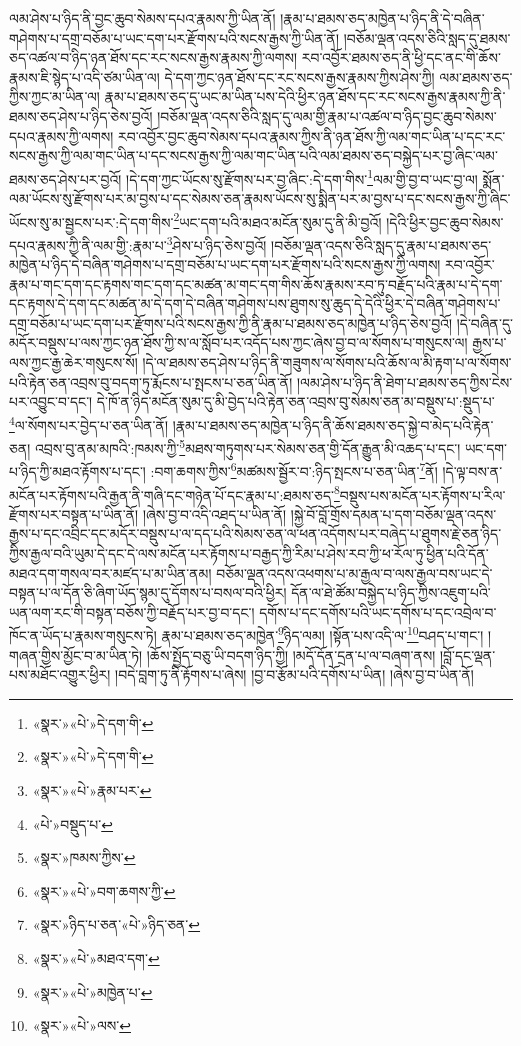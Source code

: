 ལམ་ཤེས་པ་ཉིད་ནི་བྱང་ཆུབ་སེམས་དཔའ་རྣམས་ཀྱི་ཡིན་ནོ། །རྣམ་པ་ཐམས་ཅད་མཁྱེན་པ་ཉིད་ནི་དེ་བཞིན་གཤེགས་པ་དགྲ་བཅོམ་པ་ཡང་དག་པར་རྫོགས་པའི་སངས་རྒྱས་ཀྱི་ཡིན་ནོ། །བཅོམ་ལྡན་འདས་ཅིའི་སླད་དུ་ཐམས་ཅད་འཚལ་བ་ཉིད་ཉན་ཐོས་དང་རང་སངས་རྒྱས་རྣམས་ཀྱི་ལགས། རབ་འབྱོར་ཐམས་ཅད་ནི་ཕྱི་དང་ནང་གི་ཆོས་རྣམས་ཇི་སྙེད་པ་འདི་ཙམ་ཡིན་ལ། དེ་དག་ཀྱང་ཉན་ཐོས་དང་རང་སངས་རྒྱས་རྣམས་ཀྱིས་ཤེས་ཀྱི། ལམ་ཐམས་ཅད་ཀྱིས་ཀྱང་མ་ཡིན་ལ། རྣམ་པ་ཐམས་ཅད་དུ་ཡང་མ་ཡིན་པས་དེའི་ཕྱིར་ཉན་ཐོས་དང་རང་སངས་རྒྱས་རྣམས་ཀྱི་ནི་ཐམས་ཅད་ཤེས་པ་ཉིད་ཅེས་བྱའོ། །བཅོམ་ལྡན་འདས་ཅིའི་སླད་དུ་ལམ་གྱི་རྣམ་པ་འཚལ་བ་ཉིད་བྱང་ཆུབ་སེམས་དཔའ་རྣམས་ཀྱི་ལགས། རབ་འབྱོར་བྱང་ཆུབ་སེམས་དཔའ་རྣམས་ཀྱིས་ནི་ཉན་ཐོས་ཀྱི་ལམ་གང་ཡིན་པ་དང་རང་སངས་རྒྱས་ཀྱི་ལམ་གང་ཡིན་པ་དང་སངས་རྒྱས་ཀྱི་ལམ་གང་ཡིན་པའི་ལམ་ཐམས་ཅད་བསྐྱེད་པར་བྱ་ཞིང་ལམ་ཐམས་ཅད་ཤེས་པར་བྱའོ། །དེ་དག་ཀྱང་ཡོངས་སུ་རྫོགས་པར་བྱ་ཞིང་:དེ་དག་གིས་\footnote{«སྣར་»«པེ་»དེ་དག་གི་}ལམ་གྱི་བྱ་བ་ཡང་བྱ་ལ། སྨོན་ལམ་ཡོངས་སུ་རྫོགས་པར་མ་བྱས་པ་དང་སེམས་ཅན་རྣམས་ཡོངས་སུ་སྨིན་པར་མ་བྱས་པ་དང་སངས་རྒྱས་ཀྱི་ཞིང་ཡོངས་སུ་མ་སྦྱངས་པར་:དེ་དག་གིས་\footnote{«སྣར་»«པེ་»དེ་དག་གི་}ཡང་དག་པའི་མཐའ་མངོན་སུམ་དུ་ནི་མི་བྱའོ། །དེའི་ཕྱིར་བྱང་ཆུབ་སེམས་དཔའ་རྣམས་ཀྱི་ནི་ལམ་གྱི་:རྣམ་པ་\footnote{«སྣར་»«པེ་»རྣམ་པར་}ཤེས་པ་ཉིད་ཅེས་བྱའོ། །བཅོམ་ལྡན་འདས་ཅིའི་སླད་དུ་རྣམ་པ་ཐམས་ཅད་མཁྱེན་པ་ཉིད་དེ་བཞིན་གཤེགས་པ་དགྲ་བཅོམ་པ་ཡང་དག་པར་རྫོགས་པའི་སངས་རྒྱས་ཀྱི་ལགས། རབ་འབྱོར་རྣམ་པ་གང་དག་དང་རྟགས་གང་དག་དང་མཚན་མ་གང་དག་གིས་ཆོས་རྣམས་རབ་ཏུ་བརྗོད་པའི་རྣམ་པ་དེ་དག་དང་རྟགས་དེ་དག་དང་མཚན་མ་དེ་དག་དེ་བཞིན་གཤེགས་པས་ཐུགས་སུ་ཆུད་དེ་དེའི་ཕྱིར་དེ་བཞིན་གཤེགས་པ་དགྲ་བཅོམ་པ་ཡང་དག་པར་རྫོགས་པའི་སངས་རྒྱས་ཀྱི་ནི་རྣམ་པ་ཐམས་ཅད་མཁྱེན་པ་ཉིད་ཅེས་བྱའོ། །དེ་བཞིན་དུ་མདོར་བསྡུས་པ་ལས་ཀྱང་ཉན་ཐོས་ཀྱི་ས་ལ་སློབ་པར་འདོད་པས་ཀྱང་ཞེས་བྱ་བ་ལ་སོགས་པ་གསུངས་ལ། རྒྱས་པ་ལས་ཀྱང་རྒྱ་ཆེར་གསུངས་སོ། །དེ་ལ་ཐམས་ཅད་ཤེས་པ་ཉིད་ནི་གཟུགས་ལ་སོགས་པའི་ཆོས་ལ་མི་རྟག་པ་ལ་སོགས་པའི་རྟེན་ཅན་འབྲས་བུ་བདག་ཏུ་རྨོངས་པ་སྤངས་པ་ཅན་ཡིན་ནོ། །ལམ་ཤེས་པ་ཉིད་ནི་ཐེག་པ་ཐམས་ཅད་ཀྱིས་ངེས་པར་འབྱུང་བ་དང་། དེ་ཁོ་ན་ཉིད་མངོན་སུམ་དུ་མི་བྱེད་པའི་རྟེན་ཅན་འབྲས་བུ་སེམས་ཅན་མ་བསྡུས་པ་:སྡུད་པ་\footnote{«པེ་»བསྡུད་པ་}ལ་སོགས་པར་བྱེད་པ་ཅན་ཡིན་ནོ། །རྣམ་པ་ཐམས་ཅད་མཁྱེན་པ་ཉིད་ནི་ཆོས་ཐམས་ཅད་སྐྱེ་བ་མེད་པའི་རྟེན་ཅན། འབྲས་བུ་ནམ་མཁའི་:ཁམས་ཀྱི་\footnote{«སྣར་»ཁམས་ཀྱིས་}མཐས་གཏུགས་པར་སེམས་ཅན་གྱི་དོན་རྒྱུན་མི་འཆད་པ་དང་། ཡང་དག་པ་ཉིད་ཀྱི་མཐའ་རྟོགས་པ་དང་། :བག་ཆགས་ཀྱིས་\footnote{«སྣར་»«པེ་»བག་ཆགས་ཀྱི་}མཚམས་སྦྱོར་བ་:ཉིད་སྤངས་པ་ཅན་ཡིན་\footnote{«སྣར་»ཉིད་པ་ཅན་«པེ་»ཉིད་ཅན་}ནོ། །དེ་ལྟ་བས་ན་མངོན་པར་རྟོགས་པའི་རྒྱན་ནི་གཞི་དང་གཉེན་པོ་དང་རྣམ་པ་:ཐམས་ཅད་\footnote{«སྣར་»«པེ་»མཐའ་དག་}བསྡུས་པས་མངོན་པར་རྟོགས་པ་རིལ་རྫོགས་པར་བསྟན་པ་ཡིན་ནོ། །ཞེས་བྱ་བ་འདི་འཐད་པ་ཡིན་ནོ། །སྐྱེ་བོ་བློ་གྲོས་དམན་པ་དག་བཅོམ་ལྡན་འདས་རྒྱས་པ་དང་འབྲིང་དང་མདོར་བསྡུས་པ་ལ་དད་པའི་སེམས་ཅན་ལ་ཕན་འདོགས་པར་བཞེད་པ་ཐུགས་རྗེ་ཅན་ཉིད་ཀྱིས་རྒྱལ་བའི་ཡུམ་དེ་དང་དེ་ལས་མངོན་པར་རྟོགས་པ་བརྒྱད་ཀྱི་རིམ་པ་ཤེས་རབ་ཀྱི་ཕ་རོལ་ཏུ་ཕྱིན་པའི་དོན་མཐའ་དག་གསལ་བར་མཛད་པ་མ་ཡིན་ནམ། བཅོམ་ལྡན་འདས་འཕགས་པ་མ་རྒྱལ་བ་ལས་རྒྱལ་བས་ཡང་དེ་བསྟན་པ་ལ་དོན་ཅི་ཞིག་ཡོད་སྙམ་དུ་དོགས་པ་བསལ་བའི་ཕྱིར། དོན་ལ་ཐེ་ཚོམ་བསྐྱེད་པ་ཉིད་ཀྱིས་འཇུག་པའི་ཡན་ལག་རང་གི་བསྟན་བཅོས་ཀྱི་བརྗོད་པར་བྱ་བ་དང་། དགོས་པ་དང་དགོས་པའི་ཡང་དགོས་པ་དང་འབྲེལ་བ་ཁོང་ན་ཡོད་པ་རྣམས་གསུངས་ཏེ། རྣམ་པ་ཐམས་ཅད་མཁྱེན་\footnote{«སྣར་»«པེ་»མཁྱེན་པ་}ཉིད་ལམ། །སྟོན་པས་འདི་ལ་\footnote{«སྣར་»«པེ་»ལས་}བཤད་པ་གང་། །གཞན་གྱིས་མྱོང་བ་མ་ཡིན་ཏེ། །ཆོས་སྤྱོད་བཅུ་ཡི་བདག་ཉིད་ཀྱི། །མདོ་དོན་དྲན་པ་ལ་བཞག་ནས། །བློ་དང་ལྡན་པས་མཐོང་འགྱུར་ཕྱིར། །བདེ་བླག་ཏུ་ནི་རྟོགས་པ་ཞེས། །བྱ་བ་རྩོམ་པའི་དགོས་པ་ཡིན། །ཞེས་བྱ་བ་ཡིན་ནོ། 